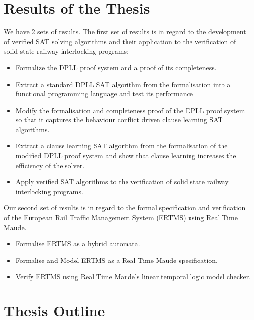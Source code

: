 \section{Results of the Thesis}
We have 2 sets of results. The first set of results is in regard to the development of verified SAT solving algorithms and their application to the verification of solid state railway interlocking programs: 


\medskip

\begin{itemize}

\item Formalize the DPLL proof system and a proof of its completeness.

\item Extract a standard DPLL SAT algorithm from the formalisation into a functional programming language and test its performance

\item Modify the formalisation and completeness proof  of the DPLL proof system so that it captures the behaviour conflict driven clause learning SAT algorithms.

\item Extract a clause learning SAT algorithm from the formalisation  of the modified DPLL proof system and show that clause learning increases the efficiency of the solver.

\item Apply verified SAT algorithms to the verification of solid state railway interlocking programs. 

\end{itemize}

Our second set of results is in regard to the formal specification and verification of the European Rail Traffic Management System (ERTMS) using Real Time Maude.

\begin{itemize}

\item Formalise ERTMS as a hybrid automata.

\item Formalise and Model ERTMS as a Real Time Maude specification.

\item Verify ERTMS using Real Time Maude's linear temporal logic model checker.

\end{itemize}




\section{Thesis Outline}


